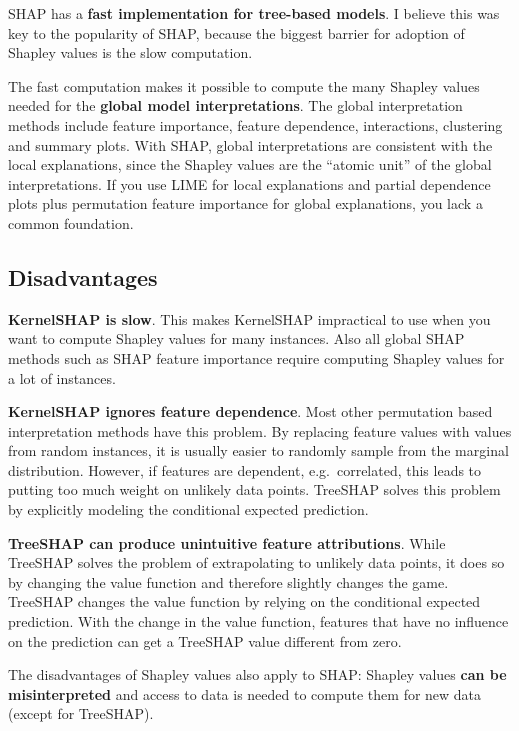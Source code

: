 \documentclass[12pt,]{krantz}
\begin{document}
SHAP has a \textbf{fast implementation for tree-based models}. I believe
this was key to the popularity of SHAP, because the biggest barrier for
adoption of Shapley values is the slow computation.

The fast computation makes it possible to compute the many Shapley
values needed for the \textbf{global model interpretations}. The global
interpretation methods include feature importance, feature dependence,
interactions, clustering and summary plots. With SHAP, global
interpretations are consistent with the local explanations, since the
Shapley values are the ``atomic unit'' of the global interpretations. If
you use LIME for local explanations and partial dependence plots plus
permutation feature importance for global explanations, you lack a
common foundation.

\subsection{Disadvantages}\label{disadvantages-17}

\textbf{KernelSHAP is slow}. This makes KernelSHAP impractical to use
when you want to compute Shapley values for many instances. Also all
global SHAP methods such as SHAP feature importance require computing
Shapley values for a lot of instances.

\textbf{KernelSHAP ignores feature dependence}. Most other permutation
based interpretation methods have this problem. By replacing feature
values with values from random instances, it is usually easier to
randomly sample from the marginal distribution. However, if features are
dependent, e.g.~correlated, this leads to putting too much weight on
unlikely data points. TreeSHAP solves this problem by explicitly
modeling the conditional expected prediction.

\textbf{TreeSHAP can produce unintuitive feature attributions}. While
TreeSHAP solves the problem of extrapolating to unlikely data points, it
does so by changing the value function and therefore slightly changes
the game. TreeSHAP changes the value function by relying on the
conditional expected prediction. With the change in the value function,
features that have no influence on the prediction can get a TreeSHAP
value different from zero.

The disadvantages of Shapley values also apply to SHAP: Shapley values
\textbf{can be misinterpreted} and access to data is needed to compute
them for new data (except for TreeSHAP).
\end{document}
